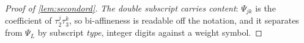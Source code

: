 \begin{proof}[Proof of \cref{lem:secondord}]
\emph{The double subscript carries content}: $\Psi_{jk}$ is the coefficient of $\tau_2^{j}\tau_3^{k}$, so
bi-affineness is readable off the notation, and it separates from $\Psi_L$ by subscript \emph{type},
integer digits against a weight symbol.


\end{proof}
